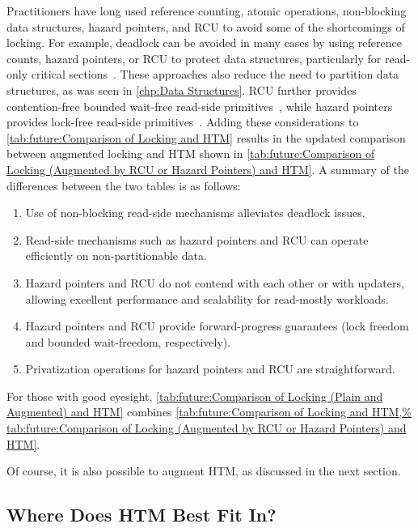 

Practitioners have long used reference counting, atomic operations,
non-blocking data structures, hazard pointers, and RCU to avoid some
of the shortcomings of locking.
For example, deadlock can be avoided in many cases by using reference
counts, hazard pointers, or RCU to protect data structures,
particularly for read-only critical
sections~\cite{MagedMichael04a,HerlihyLM02,MathieuDesnoyers2012URCU,DinakarGuniguntala2008IBMSysJ,ThomasEHart2007a}.
These approaches also reduce the need to partition data
structures, as was seen in \cref{chp:Data Structures}.
RCU further provides contention-free bounded wait-free read-side
primitives~\cite{McKenney98,MathieuDesnoyers2012URCU}, while hazard pointers
provides lock-free read-side
primitives~\cite{Michael02a,HerlihyLM02,MagedMichael04a}.
Adding these considerations to
\cref{tab:future:Comparison of Locking and HTM}
results in the updated comparison between augmented locking and HTM
shown in
\cref{tab:future:Comparison of Locking (Augmented by RCU or Hazard Pointers) and HTM}.
A summary of the differences between the two tables is as follows:

\begin{enumerate}
\item	Use of non-blocking read-side mechanisms alleviates deadlock issues.
\item	Read-side mechanisms such as hazard pointers and RCU can operate
	efficiently on non-partitionable data.
\item	Hazard pointers and RCU do not contend with each other or with
	updaters, allowing excellent performance and scalability for
	read-mostly workloads.
\item	Hazard pointers and RCU provide forward-progress guarantees
	(lock freedom and bounded wait-freedom, respectively).
\item	Privatization operations for hazard pointers and RCU are
	straightforward.
\end{enumerate}



For those with good eyesight,
\cref{tab:future:Comparison of Locking (Plain and Augmented) and HTM}
combines
\cref{tab:future:Comparison of Locking and HTM,%
tab:future:Comparison of Locking (Augmented by RCU or Hazard Pointers) and HTM}.

Of course, it is also possible to augment HTM,
as discussed in the next section.

\subsection{Where Does HTM Best Fit In?}
\label{sec:future:Where Does HTM Best Fit In?}

